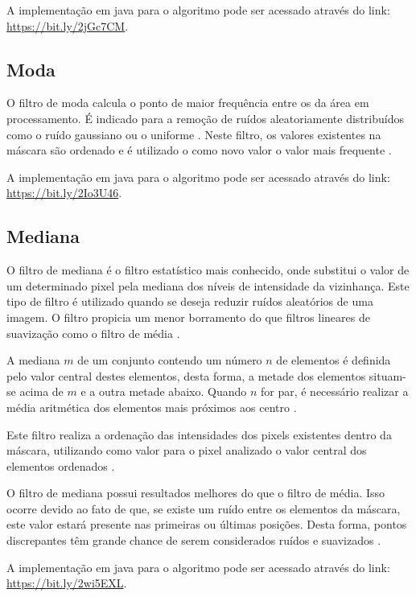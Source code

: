 \documentclass[
	12pt,				%
	oneside,			%
	a4paper,			%
	english,			%
	french,				%
	spanish,			%
	brazil,				%
	]{abntex2}
\begin{document}
A implementação em java para o algoritmo pode ser acessado através do link: \url{https://bit.ly/2jGc7CM}. 

\subsection{Moda}
O filtro de moda calcula o ponto de maior frequência entre os da área em processamento. É indicado para a remoção de ruídos aleatoriamente distribuídos como o ruído gaussiano ou o uniforme \cite{gonzalesWoods:2008}. Neste filtro, os valores existentes na máscara são ordenado e é utilizado o como novo valor o valor mais frequente \cite{conciAzevedoLeta:2008}.

A implementação em java para o algoritmo pode ser acessado através do link: \url{https://bit.ly/2Io3U46}.

\subsection{Mediana}

O filtro de mediana é o filtro estatístico mais conhecido, onde substitui o valor de um determinado pixel pela mediana dos níveis de intensidade da vizinhança. Este tipo de filtro é utilizado quando se deseja reduzir ruídos aleatórios de uma imagem. O filtro propicia um menor borramento do que filtros lineares de suavização como o filtro de média \cite{gonzalesWoods:2008}.

A mediana \(m\) de um conjunto contendo um número \(n\) de elementos é definida pelo valor central destes elementos, desta forma, a metade dos elementos situam-se acima de \(m\) e a outra metade abaixo. Quando \(n\) for par, é necessário realizar a média aritmética dos elementos mais próximos aos centro \cite{conciAzevedoLeta:2008}.

Este filtro realiza a ordenação das intensidades dos pixels existentes dentro da máscara, utilizando como valor para o pixel analizado o valor central dos elementos ordenados \cite{conciAzevedoLeta:2008}.

O filtro de mediana possui resultados melhores do que o filtro de média. Isso ocorre devido ao fato de que, se existe um ruído entre os elementos da máscara, este valor estará presente nas primeiras ou últimas posições. Desta forma, pontos discrepantes têm grande chance de serem considerados ruídos e suavizados \cite{conciAzevedoLeta:2008}.

A implementação em java para o algoritmo pode ser acessado através do link: \url{https://bit.ly/2wi5EXL}. 
\end{document}

